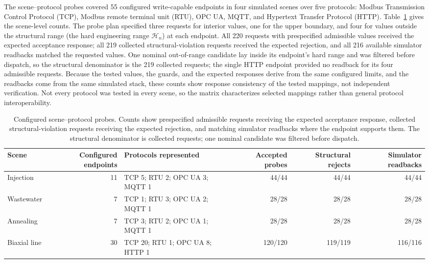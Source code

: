 The scene--protocol probes covered 55 configured write-capable endpoints in four simulated scenes over five protocols: Modbus Transmission Control Protocol (TCP), Modbus remote terminal unit (RTU), OPC UA, MQTT, and Hypertext Transfer Protocol (HTTP). Table~\ref{tab:scene-probe-results} gives the scene-level counts. The probe plan specified three requests for interior values, one for the upper boundary, and four for values outside the structural range (the hard engineering range $\mathcal{H}_n$) at each endpoint. All 220 requests with prespecified admissible values received the expected acceptance response; all 219 collected structural-violation requests received the expected rejection, and all 216 available simulator readbacks matched the requested values. One nominal out-of-range candidate lay inside its endpoint's hard range and was filtered before dispatch, so the structural denominator is the 219 collected requests; the single HTTP endpoint provided no readback for its four admissible requests. Because the tested values, the guards, and the expected responses derive from the same configured limits, and the readbacks come from the same simulated stack, these counts show response consistency of the tested mappings, not independent verification. Not every protocol was tested in every scene, so the matrix characterizes selected mappings rather than general protocol interoperability.

\begin{table}[!t]
\centering
\caption{Configured scene--protocol probes. Counts show prespecified admissible requests receiving the expected acceptance response, collected structural-violation requests receiving the expected rejection, and matching simulator readbacks where the endpoint supports them. The structural denominator is collected requests; one nominal candidate was filtered before dispatch.}
\label{tab:scene-probe-results}
\footnotesize
\setlength{\tabcolsep}{3pt}
\begin{tabularx}{\textwidth}{@{}>{\raggedright\arraybackslash}p{1.55cm}r X r r r@{}}
\toprule
Scene & Configured endpoints & Protocols represented & Accepted probes & Structural rejects & Simulator readbacks \\
\midrule
Injection & 11 & TCP 5; RTU 2; OPC UA 3; MQTT 1 & 44/44 & 44/44 & 44/44 \\
Wastewater & 7 & TCP 1; RTU 3; OPC UA 2; MQTT 1 & 28/28 & 28/28 & 28/28 \\
Annealing & 7 & TCP 3; RTU 2; OPC UA 1; MQTT 1 & 28/28 & 28/28 & 28/28 \\
Biaxial line & 30 & TCP 20; RTU 1; OPC UA 8; HTTP 1 & 120/120 & 119/119 & 116/116 \\
\bottomrule
\end{tabularx}
\end{table}

